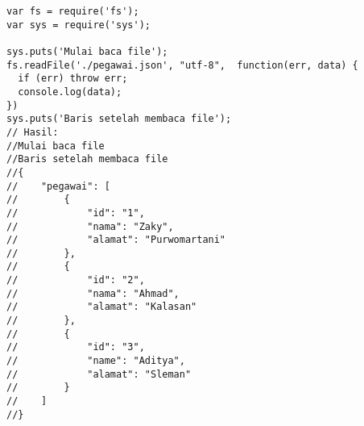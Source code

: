 \lstset{language=JavaScript,caption=Membaca file secara asynchronous}
\begin{lstlisting}
var fs = require('fs');
var sys = require('sys');

sys.puts('Mulai baca file');
fs.readFile('./pegawai.json', "utf-8",  function(err, data) {
  if (err) throw err;
  console.log(data);
})
sys.puts('Baris setelah membaca file');
// Hasil:
//Mulai baca file
//Baris setelah membaca file
//{
//    "pegawai": [
//        {
//            "id": "1",
//            "nama": "Zaky",
//            "alamat": "Purwomartani"
//        },
//        {
//            "id": "2",
//            "nama": "Ahmad",
//            "alamat": "Kalasan"
//        },
//        {
//            "id": "3",
//            "name": "Aditya",
//            "alamat": "Sleman"
//        }
//    ]
//}
\end{lstlisting}

